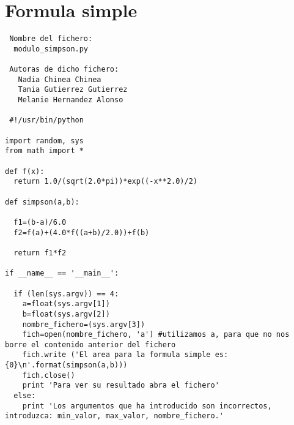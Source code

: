 
\label{Apendice1:XXX}

\section{Formula simple }
\begin{center}
\begin{footnotesize}
\begin{verbatim}
 Nombre del fichero:
  modulo_simpson.py

 Autoras de dicho fichero:
   Nadia Chinea Chinea 
   Tania Gutierrez Gutierrez 
   Melanie Hernandez Alonso
  
 #!/usr/bin/python

import random, sys
from math import *

def f(x):
  return 1.0/(sqrt(2.0*pi))*exp((-x**2.0)/2)
  
def simpson(a,b):
  
  f1=(b-a)/6.0
  f2=f(a)+(4.0*f((a+b)/2.0))+f(b)
  
  return f1*f2   
  
if __name__ == '__main__':
  
  if (len(sys.argv)) == 4:
    a=float(sys.argv[1])
    b=float(sys.argv[2])
    nombre_fichero=(sys.argv[3])
    fich=open(nombre_fichero, 'a') #utilizamos a, para que no nos borre el contenido anterior del fichero
    fich.write ('El area para la formula simple es:{0}\n'.format(simpson(a,b)))
    fich.close()
    print 'Para ver su resultado abra el fichero'
  else:
    print 'Los argumentos que ha introducido son incorrectos, introduzca: min_valor, max_valor, nombre_fichero.'

\end{verbatim}
\end{footnotesize}
\end{center}



